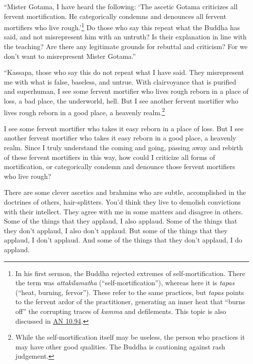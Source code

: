 \documentclass[12pt,openany]{book}%
\begin{document}
“Mister Gotama, I have heard the following: ‘The ascetic Gotama criticizes all fervent mortification. He categorically condemns and denounces all fervent mortifiers who live rough.’\footnote{In his first sermon, the Buddha rejected extremes of self-mortification. There the term was \textit{attakilamatha} (“self-mortification”), whereas here it is \textit{tapas} (“heat, burning, fervor”). These refer to the same practices, but \textit{tapas} points to the fervent ardor of the practitioner, generating an inner heat that “burns off” the corrupting traces of \textit{kamma} and defilements. This topic is also discussed in \href{https://suttacentral.net/an10.94/en/sujato}{AN 10.94}. } Do those who say this repeat what the Buddha has said, and not misrepresent him with an untruth? Is their explanation in line with the teaching? Are there any legitimate grounds for rebuttal and criticism? For we don’t want to misrepresent Mister Gotama.” 

“Kassapa, those who say this do not repeat what I have said. They misrepresent me with what is false, baseless, and untrue. With clairvoyance that is purified and superhuman, I see some fervent mortifier who lives rough reborn in a place of loss, a bad place, the underworld, hell. But I see another fervent mortifier who lives rough reborn in a good place, a heavenly realm.\footnote{While the self-mortification itself may be useless, the person who practices it may have other good qualities. The Buddha is cautioning against rash judgement. } 

I see some fervent mortifier who takes it easy reborn in a place of loss. But I see another fervent mortifier who takes it easy reborn in a good place, a heavenly realm. Since I truly understand the coming and going, passing away and rebirth of these fervent mortifiers in this way, how could I criticize all forms of mortification, or categorically condemn and denounce those fervent mortifiers who live rough? 

There are some clever ascetics and brahmins who are subtle, accomplished in the doctrines of others, hair-splitters. You’d think they live to demolish convictions with their intellect. They agree with me in some matters and disagree in others. Some of the things that they applaud, I also applaud. Some of the things that they don’t applaud, I also don’t applaud. But some of the things that they applaud, I don’t applaud. And some of the things that they don’t applaud, I do applaud. 
\end{document}
